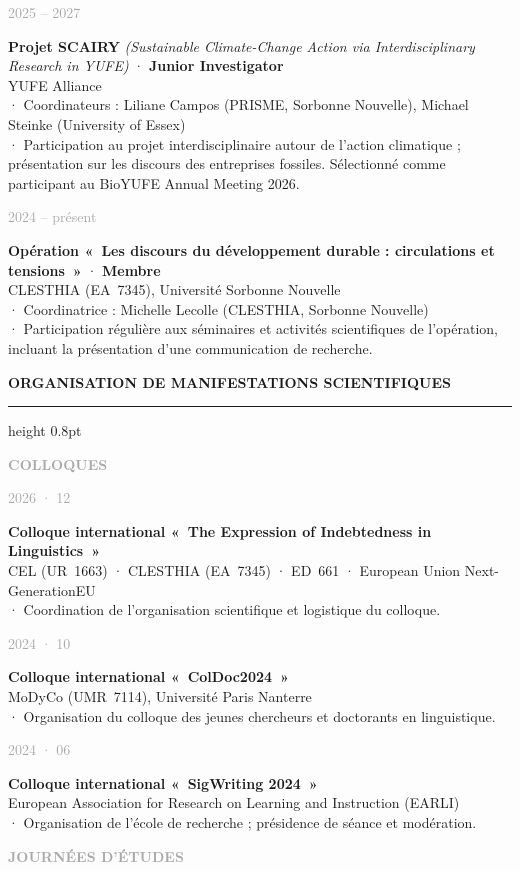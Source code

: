 \documentclass[10.5pt, a4paper]{article}
\newlength{\datecol}
\newlength{\contentcol}
\newcommand{\cvrow}[2]{%
  \noindent
  \parbox[t]{\datecol}{\raggedleft\textcolor{darkgray}{\small #1}}%
  \hspace{1.2em}%
  \parbox[t]{\contentcol}{\sloppy\hbadness=10000 #2}%
  \par\vspace{0.6em}%
}
\newcommand{\cvsection}[1]{%
  \vspace{10pt}%
  {\color{navy}\large\bfseries\MakeUppercase{#1}}%
  \vspace{2pt}%
  {\color{navy}\hrule height 0.8pt}%
  \vspace{6pt}%
}
\newcommand{\cvsubsection}[1]{%
  \vspace{5pt}%
  {\small\bfseries\textcolor{darkgray}{\MakeUppercase{#1}}}%
  \vspace{3pt}\par%
}
\begin{document}
\cvrow{2025 -- 2027}{%
  \textbf{Projet SCAIRY}
  \textit{(Sustainable Climate-Change Action via Interdisciplinary Research in YUFE)}
  · \textbf{Junior Investigator}\\
  {\small YUFE Alliance\\
   · Coordinateurs : Liliane Campos (PRISME, Sorbonne Nouvelle), Michael Steinke (University of Essex)\\
   · Participation au projet interdisciplinaire autour de l'action climatique ;
  présentation sur les discours des entreprises fossiles.
  Sélectionné comme participant au BioYUFE Annual Meeting 2026.}}

\cvrow{2024 -- présent}{%
  \textbf{Opération «~Les discours du développement durable :
  circulations et tensions~»}
  · \textbf{Membre}\\
  {\small CLESTHIA (EA~7345), Université Sorbonne Nouvelle\\
   · Coordinatrice : Michelle Lecolle (CLESTHIA, Sorbonne Nouvelle)\\
   · Participation régulière aux séminaires et activités scientifiques de l'opération,
  incluant la présentation d'une communication de recherche.}}

\cvsection{Organisation de manifestations scientifiques}

\cvsubsection{Colloques}

\cvrow{2026 · 12}{%
  \textbf{Colloque international
  «~The Expression of Indebtedness in Linguistics~»}\\
  {\small CEL (UR~1663) · CLESTHIA (EA~7345) · ED~661
  · European Union Next-GenerationEU\\
   · Coordination de l'organisation scientifique et logistique du colloque.}}

\cvrow{2024 · 10}{%
  \textbf{Colloque international «~ColDoc2024~»}\\
  {\small MoDyCo (UMR~7114), Université Paris Nanterre\\
   · Organisation du colloque des jeunes chercheurs et doctorants en linguistique.}}

\cvrow{2024 · 06}{%
  \textbf{Colloque international «~SigWriting 2024~»}\\
  {\small European Association for Research on Learning and Instruction (EARLI)\\
   · Organisation de l'école de recherche ; présidence de séance et modération.}}

\cvsubsection{Journées d'études}
\end{document}
